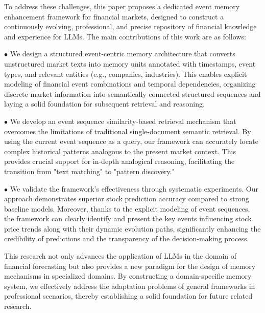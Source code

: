\documentclass[sigconf, nonacm]{acmart} %
\begin{document}
To address these challenges, this paper proposes a dedicated event memory enhancement framework for financial markets, designed to construct a continuously evolving, professional, and precise repository of financial knowledge and experience for LLMs. The main contributions of this work are as follows:


$\bullet$ We design a structured event-centric memory architecture that converts unstructured market texts into memory units annotated with timestamps, event types, and relevant entities (e.g., companies, industries). This enables explicit modeling of financial event combinations and temporal dependencies, organizing discrete market information into semantically connected structured sequences and laying a solid foundation for subsequent retrieval and reasoning.

$\bullet$ We develop an event sequence similarity-based retrieval mechanism that overcomes the limitations of traditional single-document semantic retrieval. By using the current event sequence as a query, our framework can accurately locate complex historical patterns analogous to the present market context. This provides crucial support for in-depth analogical reasoning, facilitating the transition from "text matching" to "pattern discovery."

$\bullet$ We validate the framework's effectiveness through systematic experiments. Our approach demonstrates superior stock prediction accuracy compared to strong baseline models. Moreover, thanks to the explicit modeling of event sequences, the framework can clearly identify and present the key events influencing stock price trends along with their dynamic evolution paths, significantly enhancing the credibility of predictions and the transparency of the decision-making process.

This research not only advances the application of LLMs in the domain of financial forecasting but also provides a new paradigm for the design of memory mechanisms in specialized domains. By constructing a domain-specific memory system, we effectively address the adaptation problems of general frameworks in professional scenarios, thereby establishing a solid foundation for future related research.
\end{document}
